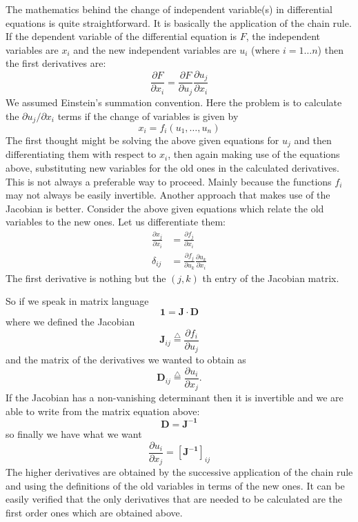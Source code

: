 The mathematics behind the change of independent variable(s) in differential
equations is quite straightforward. It is basically the application of the
chain rule. If the dependent variable of the differential equation is $F$,
the independent variables are $x_{i}$ and the new independent variables are
$u_{i}$ (where ${\scriptstyle i=1\ldots n}$) then the first derivatives are:
\[
    \frac{\partial F}{\partial x_{i}} = \frac{\partial F}{\partial u_{j}}
                                        \frac{\partial u_{j}}{\partial x_{i}}
\]
We assumed Einstein's summation convention. Here the problem is to
calculate the $\partial u_{j}/\partial x_{i}$ terms if the change of variables
is given by
\[
    x_{i} = f_{i}(u_{1},\ldots,u_{n})
\]
The first thought might be solving the above given equations for $u_{j}$ and
then differentiating them with respect to $x_{i}$, then again making use of the
equations above, substituting new variables for the old ones in the calculated
derivatives. This is not always a  preferable way to proceed. Mainly because
the functions $f_{i}$ may not always be easily invertible. Another approach
that makes use of the Jacobian is better. Consider the above given equations
which relate the old variables to the new ones. Let us differentiate them:
\begin{align*}
  \frac{\partial x_{j}}{\partial x_{i}} & =
        \frac{\partial f_{j}}{\partial x_{i}}   \\
  \delta_{ij} & =
        \frac{\partial f_{j}}{\partial u_{k}}
        \frac{\partial u_{k}}{\partial x_{i}}
\end{align*}
The first derivative is nothing but the $(j,k)$ th entry of the Jacobian matrix.

So if we speak in matrix language
\[ \mathbf{1 = J \cdot D} \]
where we defined the Jacobian
\[ \mathbf{J}_{ij} \stackrel{\triangle}{=}  \frac{\partial f_{i}}{\partial u_{j}} \]
and the matrix of the derivatives we wanted to obtain as
\[ \mathbf{D}_{ij} \stackrel{\triangle}{=}  \frac{\partial u_{i}}{\partial x_{j}}. \]
If the Jacobian has a non-vanishing determinant then it is invertible and
we are able to write from the matrix equation above:
\[ \mathbf{ D = J^{-1}} \]
so finally we have what we want
\[
   \frac{\partial u_{i}}{\partial x_{j}} = \left[\mathbf{J^{-1}}\right]_{ij}
\]
The higher derivatives are obtained by the successive application of the chain
rule and using the definitions of the old variables in terms of the new ones. It
can be easily verified that the only derivatives that are needed to be
calculated are the first order ones which are obtained above.

